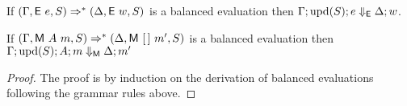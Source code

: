 \begin{theorem}
  If $(\Gamma, \textsf{E}~e, S) \Rightarrow^{*} (\Delta, \textsf{E}~w,
  S)$ is a balanced evaluation then
  $\Gamma;\text{upd}(S); e \Downarrow_{\textsf{E}} \Delta; w$.

  If $(\Gamma, \textsf{M}~A~m, S) \Rightarrow^{*} (\Delta,
  \textsf{M}~[\,]~m', S)$ is a balanced evaluation then
  $\Gamma;\text{upd}(S); A;m \Downarrow_{\textsf{M}} \Delta;m'$
\end{theorem}

\begin{proof}
  The proof is by induction on the derivation of balanced evaluations
  following the grammar rules above.
\end{proof}

